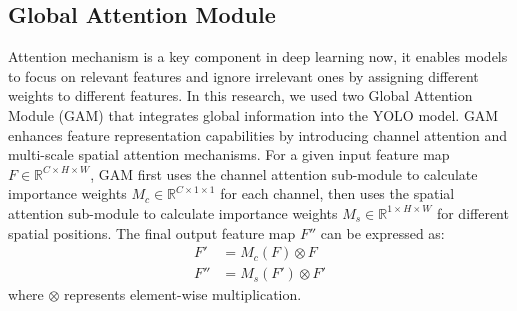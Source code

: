 \documentclass[10pt]{article}
\begin{document}
\subsection{Global Attention Module}
Attention mechanism is a key component in deep learning now, it enables models to focus on relevant features and ignore irrelevant ones by assigning different weights to different features. In this research, we used two Global Attention Module (GAM) that integrates global information into the YOLO model. GAM enhances feature representation capabilities by introducing channel attention and multi-scale spatial attention mechanisms. For a given input feature map $F \in \mathbb{R}^{C \times H \times W}$, GAM first uses the channel attention sub-module to calculate importance weights $M_c \in \mathbb{R}^{C \times 1 \times 1}$ for each channel, then uses the spatial attention sub-module to calculate importance weights $M_s \in \mathbb{R}^{1 \times H \times W}$ for different spatial positions. The final output feature map $F''$ can be expressed as:
\begin{align}
  F' &= M_c(F) \otimes F \\
  F'' &= M_s(F') \otimes F'
  \label{eq:gam_formula}
\end{align}
where $\otimes$ represents element-wise multiplication.
\end{document}
